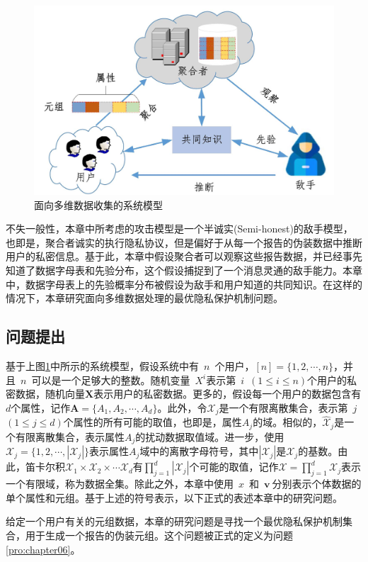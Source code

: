 \begin{figure}[htbp]
	\centering
	\includegraphics[width = 0.65\linewidth]{./figures/chapter06/chapter06_1.jpg}
	\caption{面向多维数据收集的系统模型}
	\label{fig:chapter06_Fig01}
\end{figure}

不失一般性，本章中所考虑的攻击模型是一个半诚实(Semi-honest)的敌手模型，也即是，聚合者诚实的执行隐私协议，但是偏好于从每一个报告的伪装数据中推断用户的私密信息。基于此，本章中假设聚合者可以观察这些报告数据，并已经事先知道了数据字母表和先验分布，这个假设捕捉到了一个消息灵通的敌手能力。本章中，数据字母表上的先验概率分布被假设为敌手和用户知道的共同知识。在这样的情况下，本章研究面向多维数据处理的最优隐私保护机制问题。

\subsection{问题提出}\label{sec:chapter06_problem_statement}
基于上图\ref{fig:chapter06_Fig01}中所示的系统模型，假设系统中有~$n$~个用户，$[n]=\{1,2,\cdots,n\}$，并且~$n$~可以是一个足够大的整数。随机变量~$X^i$表示第~$i$~$(1\leq i \leq n)$个用户的私密数据，随机向量$\bm{X}$表示用户的私密数据。更多的，假设每一个用户的数据包含有$d$个属性，记作$\bm{A}=\{A_1,A_2,\cdots,A_d\}$。此外，令$\mathcal{X}_j$是一个有限离散集合，表示第~$j$~$(1 \leq j \leq d)$个属性的所有可能的取值，也即是，属性$A_j$的域。相似的，$\hat{\mathcal{X}}_j$是一个有限离散集合，表示属性$A_j$的扰动数据取值域。进一步，使用$\mathcal{X}_j=\{1,2,\cdots,|\mathcal{X}_j|\}$表示属性$A_j$域中的离散字母符号，其中$|\mathcal{X}_j|$是$\mathcal{X}_j$的基数。由此，笛卡尔积$\mathcal{X}_1\times \mathcal{X}_2\times \cdots \mathcal{X}_d$有$\prod_{j=1}^{d}|\mathcal{X}_j|$个可能的取值，记作$\mathcal{X}=\prod_{j=1}^{d}\mathcal{X}_j$表示一个有限域，称为数据全集。除此之外，本章中使用~$x$~和~$\bm{v}~$分别表示个体数据的单个属性和元组。基于上述的符号表示，以下正式的表述本章中的研究问题。


给定一个用户有关的元组数据，本章的研究问题是寻找一个最优隐私保护机制集合，用于生成一个报告的伪装元组。这个问题被正式的定义为问题\ref{pro:chapter06}。

